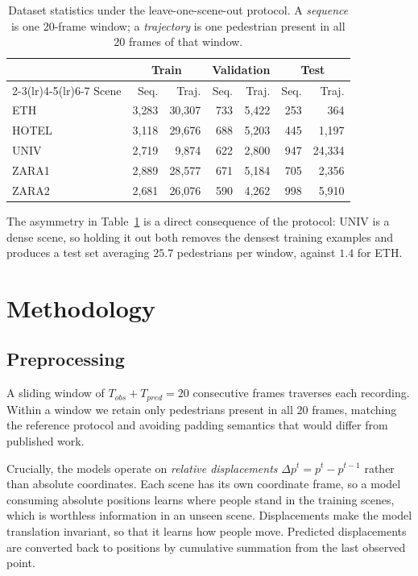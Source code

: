 \documentclass[conference]{IEEEtran}
\begin{document}
\begin{table}[t]
\caption{Dataset statistics under the leave-one-scene-out protocol. A \emph{sequence} is
one 20-frame window; a \emph{trajectory} is one pedestrian present in all 20 frames of
that window.}
\label{tab:dataset}
\centering
\small
\begin{tabular}{lrrrrrr}
\toprule
 & \multicolumn{2}{c}{Train} & \multicolumn{2}{c}{Validation} & \multicolumn{2}{c}{Test} \\
\cmidrule(lr){2-3}\cmidrule(lr){4-5}\cmidrule(lr){6-7}
Scene & Seq. & Traj. & Seq. & Traj. & Seq. & Traj. \\
\midrule
ETH   & 3{,}283 & 30{,}307 & 733 & 5{,}422 & 253 & 364 \\
HOTEL & 3{,}118 & 29{,}676 & 688 & 5{,}203 & 445 & 1{,}197 \\
UNIV  & 2{,}719 & 9{,}874  & 622 & 2{,}800 & 947 & 24{,}334 \\
ZARA1 & 2{,}889 & 28{,}577 & 671 & 5{,}184 & 705 & 2{,}356 \\
ZARA2 & 2{,}681 & 26{,}076 & 590 & 4{,}262 & 998 & 5{,}910 \\
\bottomrule
\end{tabular}
\end{table}

The asymmetry in Table~\ref{tab:dataset} is a direct consequence of the protocol: UNIV is
a dense scene, so holding it out both removes the densest training examples and produces a
test set averaging $25.7$ pedestrians per window, against $1.4$ for ETH.

\section{Methodology}

\subsection{Preprocessing}

A sliding window of $T_{obs}+T_{pred}=20$ consecutive frames traverses each recording.
Within a window we retain only pedestrians present in all $20$ frames, matching the
reference protocol and avoiding padding semantics that would differ from published work.

Crucially, the models operate on \emph{relative displacements}
$\Delta p^t = p^t - p^{t-1}$ rather than absolute coordinates. Each scene has its own
coordinate frame, so a model consuming absolute positions learns where people stand in the
training scenes, which is worthless information in an unseen scene. Displacements make the
model translation invariant, so that it learns how people move. Predicted displacements
are converted back to positions by cumulative summation from the last observed point.
\end{document}
